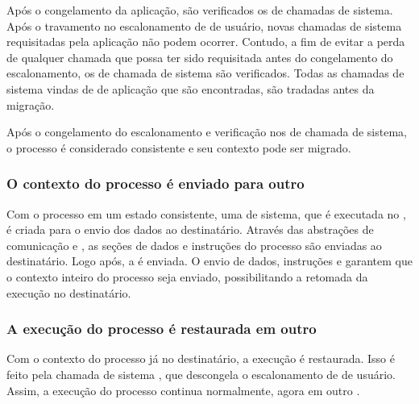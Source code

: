     Após o congelamento da aplicação, são verificados os \buffers de chamadas de sistema. Após o travamento no escalonamento de \threads de usuário, novas chamadas de sistema requisitadas pela aplicação não podem ocorrer. Contudo, a fim de evitar a perda de qualquer chamada que possa ter sido requisitada antes do congelamento do escalonamento, os \buffers de chamada de sistema são verificados. Todas as chamadas de sistema vindas de \threads de aplicação que são encontradas, são tradadas antes da migração.

    Após o congelamento do escalonamento e verificação nos \buffers de chamada de sistema, o processo é considerado consistente e seu contexto pode ser migrado.

\subsubsection{O contexto do processo é enviado para outro \cluster}

    Com o processo em um estado consistente, uma \task de sistema, que é executada no \mcore, é criada para o envio dos dados ao \cluster destinatário. Através das abstrações de comunicação \mailbox e \portal, as seções de dados e instruções do processo são enviadas ao \cluster destinatário. Logo após, a \uarea é enviada. O envio de dados, instruções e \uarea garantem que o contexto inteiro do processo seja enviado, possibilitando a retomada da execução no \cluster destinatário.

\subsubsection{A execução do processo é restaurada em outro \cluster}

    Com o contexto do processo já no \cluster destinatário, a execução é restaurada. Isso é feito pela chamada de sistema \unfreeze, que descongela o escalonamento de \threads de usuário. Assim, a execução do processo continua normalmente, agora em outro \cluster.
